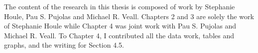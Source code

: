 \documentclass[12pt,twoside]{Mactemplate}
\begin{document}
  \listoftables
  \thispagestyle{plain}

  \listoffigures
  \thispagestyle{plain}
  \begin{declaration}
    \label{doaac} The content of the research in this thesis is composed of
    work by Stephanie Houle, Pau S. Pujolas and Michael R. Veall. Chapters 2
    and 3 are solely the work of Stephanie Houle while Chapter 4 was joint
    work with Pau S. Pujolas and Michael R. Veall. To Chapter 4, I
    contributed all the data work, tables and graphs, and the writing for
    Section 4.5.
    \thispagestyle{plain}
  \end{declaration}


\mainmatter %




\end{document}
